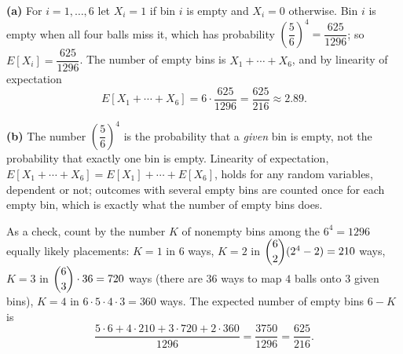 \textbf{(a)} For $i=1,\ldots,6$ let $X_i=1$ if bin $i$ is empty and $X_i=0$ otherwise. Bin $i$ is empty when all four balls miss it, which has probability $\left(\dfrac{5}{6}\right)^4=\dfrac{625}{1296}$; so $E[X_i]=\dfrac{625}{1296}$. The number of empty bins is $X_1+\cdots+X_6$, and by linearity of expectation
\[E[X_1+\cdots+X_6]=6\cdot\dfrac{625}{1296}=\boxed{\dfrac{625}{216}}\approx2.89 .\]

\textbf{(b)} The number $\left(\dfrac{5}{6}\right)^4$ is the probability that a \emph{given} bin is empty, not the probability that exactly one bin is empty. Linearity of expectation, $E[X_1+\cdots+X_6]=E[X_1]+\cdots+E[X_6]$, holds for any random variables, dependent or not; outcomes with several empty bins are counted once for each empty bin, which is exactly what the number of empty bins does.

As a check, count by the number $K$ of nonempty bins among the $6^4=1296$ equally likely placements: $K=1$ in $6$ ways, $K=2$ in $\dbinom62(2^4-2)=210$ ways, $K=3$ in $\dbinom63\cdot36=720$ ways (there are $36$ ways to map $4$ balls onto $3$ given bins), $K=4$ in $6\cdot5\cdot4\cdot3=360$ ways. The expected number of empty bins $6-K$ is
\[\dfrac{5\cdot6+4\cdot210+3\cdot720+2\cdot360}{1296}=\dfrac{3750}{1296}=\dfrac{625}{216}.\]
